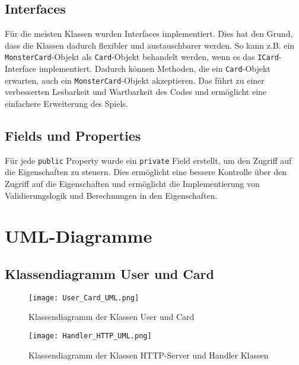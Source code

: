 \documentclass[a4paper, 12pt]{article}
\begin{document}
\subsection{Interfaces}
Für die meisten Klassen wurden Interfaces implementiert. Dies hat den Grund, dass die Klassen dadurch flexibler und austauschbarer werden. So kann z.B. ein \texttt{MonsterCard}-Objekt als \texttt{Card}-Objekt behandelt werden, wenn es das \texttt{ICard}-Interface implementiert. Dadurch können Methoden, die ein \texttt{Card}-Objekt erwarten, auch ein \texttt{MonsterCard}-Objekt akzeptieren.
Das führt zu einer verbesserten Lesbarkeit und Wartbarkeit des Codes und ermöglicht eine einfachere Erweiterung des Spiels.

\subsection{Fields und Properties}
Für jede \texttt{public} Property wurde ein \texttt{private} Field erstellt, um den Zugriff auf die Eigenschaften zu steuern. Dies ermöglicht eine bessere Kontrolle über den Zugriff auf die Eigenschaften und ermöglicht die Implementierung von Validierungslogik und Berechnungen in den Eigenschaften.

\pagebreak

\section{UML-Diagramme}
\subsection{Klassendiagramm User und Card}
\begin{figure}[h]
    \centering
    \texttt{[image: User\_Card\_UML.png]}
    \caption{Klassendiagramm der Klassen User und Card}
\end{figure}

\begin{figure} [h]
    \centering
    \texttt{[image: Handler\_HTTP\_UML.png]}
    \caption{Klassendiagramm der Klassen HTTP-Server und Handler Klassen}
\end{figure}
\end{document}
